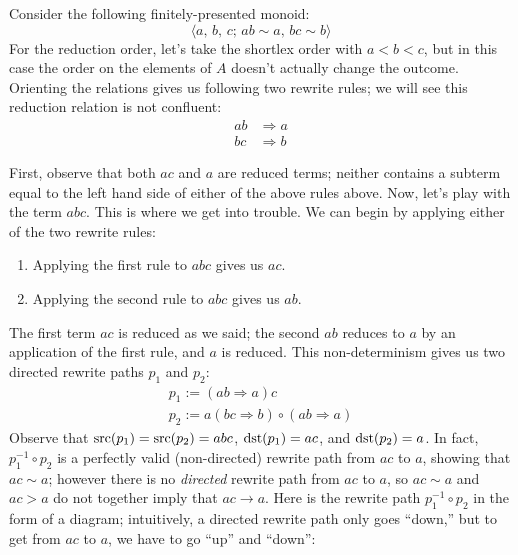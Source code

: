 \documentclass[../generics]{subfiles}
\begin{document}
\begin{example}
Consider the following finitely-presented monoid:
\[\langle a,\,b,\,c;\,ab\sim a,\,bc\sim b\rangle\]
For the reduction order, let's take the shortlex order with $a<b<c$, but in this case the order on the elements of $A$ doesn't actually change the outcome. Orienting the relations gives us following two rewrite rules; we will see this reduction relation is not confluent:
\begin{align*}
ab&\Rightarrow a\\
bc&\Rightarrow b
\end{align*}

%
First, observe that both $ac$ and $a$ are reduced terms; neither contains a subterm equal to the left hand side of either of the above rules above. Now, let's play with the term $abc$. This is where we get into trouble. We can begin by applying either of the two rewrite rules:
\begin{enumerate}
\item Applying the first rule to $abc$ gives us $ac$.
\item Applying the second rule to $abc$ gives us $ab$.
\end{enumerate}
The first term $ac$ is reduced as we said; the second $ab$ reduces to $a$ by an application of the first rule, and $a$ is reduced. This non-determinism gives us two directed rewrite paths $p_1$ and $p_2$:
\begin{gather*}
p_1 := (ab\Rightarrow a)c\\
p_2 := a(bc\Rightarrow b)\circ(ab\Rightarrow a)
\end{gather*}
%
Observe that $\operatorname{src}(p_1)=\operatorname{src}(p_2)=abc$, $\operatorname{dst}(p_1)=ac$, and $\operatorname{dst}(p_2)=a$. In fact, $p_1^{-1}\circ p_2$ is a perfectly valid (non-directed) rewrite path from $ac$ to $a$, showing that $ac\sim a$; however there is no \emph{directed} rewrite path from $ac$ to $a$, so $ac\sim a$ and $ac>a$ do not together imply that $ac\rightarrow a$. Here is the rewrite path $p_1^{-1}\circ p_2$ in the form of a diagram; intuitively, a directed rewrite path only goes ``down,'' but to get from $ac$ to $a$, we have to go ``up'' and ``down'':
\begin{quote}
\end{quote}
\end{example}
\end{document}
